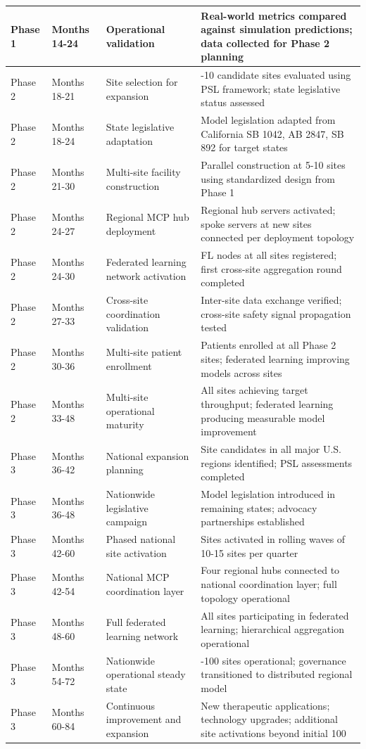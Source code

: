 \begin{longtable}{l l >{\raggedright\arraybackslash}p{4.0cm} >{\raggedright\arraybackslash}p{5.5cm}}
Phase 1 & Months 14-24 & Operational validation & Real-world metrics compared against simulation predictions; data collected for Phase 2 planning \\
\midrule
Phase 2 & Months 18-21 & Site selection for expansion & 5-10 candidate sites evaluated using PSL framework; state legislative status assessed \\
Phase 2 & Months 18-24 & State legislative adaptation & Model legislation adapted from California SB 1042, AB 2847, SB 892 for target states \\
Phase 2 & Months 21-30 & Multi-site facility construction & Parallel construction at 5-10 sites using standardized design from Phase 1 \\
Phase 2 & Months 24-27 & Regional MCP hub deployment & Regional hub servers activated; spoke servers at new sites connected per deployment topology \\
Phase 2 & Months 24-30 & Federated learning network activation & FL nodes at all sites registered; first cross-site aggregation round completed \\
Phase 2 & Months 27-33 & Cross-site coordination validation & Inter-site data exchange verified; cross-site safety signal propagation tested \\
Phase 2 & Months 30-36 & Multi-site patient enrollment & Patients enrolled at all Phase 2 sites; federated learning improving models across sites \\
Phase 2 & Months 33-48 & Multi-site operational maturity & All sites achieving target throughput; federated learning producing measurable model improvement \\
\midrule
Phase 3 & Months 36-42 & National expansion planning & Site candidates in all major U.S. regions identified; PSL assessments completed \\
Phase 3 & Months 36-48 & Nationwide legislative campaign & Model legislation introduced in remaining states; advocacy partnerships established \\
Phase 3 & Months 42-60 & Phased national site activation & Sites activated in rolling waves of 10-15 sites per quarter \\
Phase 3 & Months 42-54 & National MCP coordination layer & Four regional hubs connected to national coordination layer; full topology operational \\
Phase 3 & Months 48-60 & Full federated learning network & All sites participating in federated learning; hierarchical aggregation operational \\
Phase 3 & Months 54-72 & Nationwide operational steady state & 50-100 sites operational; governance transitioned to distributed regional model \\
Phase 3 & Months 60-84 & Continuous improvement and expansion & New therapeutic applications; technology upgrades; additional site activations beyond initial 100 \\
\end{longtable}

